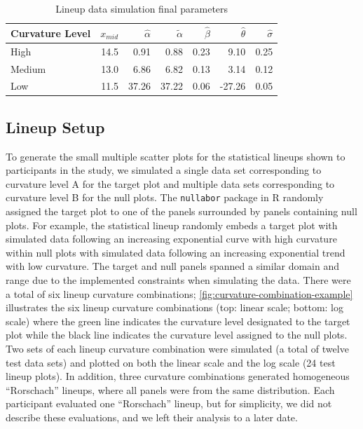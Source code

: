 \documentclass[12pt]{article}
\begin{document}
\begin{table}

\caption{\label{tab:parameter-data}Lineup data simulation final parameters}
\centering
\begin{tabular}[t]{lrrrrrr}
\toprule
Curvature Level & $x_{mid}$ & $\hat\alpha$ & $\tilde\alpha$ & $\hat\beta$ & $\hat\theta$ & $\hat\sigma$\\
\midrule
High & 14.5 & 0.91 & 0.88 & 0.23 & 9.10 & 0.25\\
Medium & 13.0 & 6.86 & 6.82 & 0.13 & 3.14 & 0.12\\
Low & 11.5 & 37.26 & 37.22 & 0.06 & -27.26 & 0.05\\
\bottomrule
\end{tabular}
\end{table}

\hypertarget{lineup-setup}{%
\subsection{Lineup Setup}\label{lineup-setup}}

To generate the small multiple scatter plots for the statistical lineups
shown to participants in the study, we simulated a single data set
corresponding to curvature level A for the target plot and multiple data
sets corresponding to curvature level B for the null plots. The
\texttt{nullabor} package in R \citep{buja_statistical_2009} randomly
assigned the target plot to one of the panels surrounded by panels
containing null plots. For example, the statistical lineup randomly
embeds a target plot with simulated data following an increasing
exponential curve with high curvature within null plots with simulated
data following an increasing exponential trend with low curvature. The
target and null panels spanned a similar domain and range due to the
implemented constraints when simulating the data. There were a total of
six lineup curvature combinations;
\cref{fig:curvature-combination-example} illustrates the six lineup
curvature combinations (top: linear scale; bottom: log scale) where the
green line indicates the curvature level designated to the target plot
while the black line indicates the curvature level assigned to the null
plots. Two sets of each lineup curvature combination were simulated (a
total of twelve test data sets) and plotted on both the linear scale and
the log scale (24 test lineup plots). In addition, three curvature
combinations generated homogeneous ``Rorschach'' lineups, where all
panels were from the same distribution. Each participant evaluated one
``Rorschach'' lineup, but for simplicity, we did not describe these
evaluations, and we left their analysis to a later date.
\end{document}
